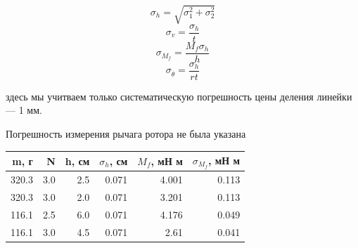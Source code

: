 \[\displaystyle \sigma_{h} = \sqrt{\sigma_{1}^{2} + \sigma_{2}^{2}}\]
\[\displaystyle \sigma_{v} = \frac{\sigma_{h}}{t}\]
\[\displaystyle \sigma_{M_f} = \frac{M_{f} \sigma_{h}}{h}\]
\[\displaystyle \sigma_{\dot{\theta}} = \frac{\sigma_{h}}{r t}\]
{\raggedright здесь мы учитваем только систематическую погрешность цены деления линейки— 1 мм.\par}
{\raggedright Погрешность измерения рычага ротора не была указана \par}
\par\vspace{3mm}
\begin{tabular}{rrrrrr}
\toprule
m, г & N & h, см & $\sigma_h$, см & $M_f$, мН м & $\sigma_{M_f}$, мН м \\
\midrule
320.3 & 3.0 & 2.5 & 0.071 & 4.001 & 0.113 \\
320.3 & 3.0 & 2.0 & 0.071 & 3.201 & 0.113 \\
116.1 & 2.5 & 6.0 & 0.071 & 4.176 & 0.049 \\
116.1 & 3.0 & 4.5 & 0.071 & 2.61 & 0.041 \\
\bottomrule
\end{tabular}
\par\vspace{5mm}
